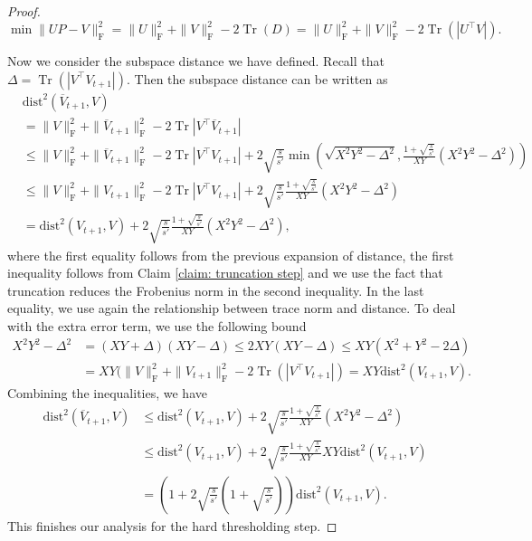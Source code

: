 \documentclass[11pt]{article}
\newcommand{\hs}{s'}
\newcommand{\scale}{V}
\newcommand{\gd}{\overline{V}}
\DeclareMathOperator{\Tr}{Tr}
\newcommand{\0}{{\mathbf{0}}}
\begin{document}
\begin{proof}
\begin{equation*}
    \min \|UP-V\|_\mathrm{F}^2=\|U\|_\mathrm{F}^2+\|V\|_\mathrm{F}^2-2\Tr(D)=\|U\|_\mathrm{F}^2+\|V\|_\mathrm{F}^2-2\Tr(|U^\top  V|).
\end{equation*}

Now we consider the subspace distance we have defined. 
Recall that $\Delta=\Tr(|{\scale}^\top  V_{t+1}|)$. 
Then the subspace distance can be written as
\begin{align*}
   & \mathrm{dist}^2(\gd_{t+1},\scale)\\
   &=\|\scale\|_\mathrm{F}^2+\|\gd_{t+1}\|_\mathrm{F}^2-2\Tr|{\scale}^\top  \gd_{t+1}|\\
    &\leq \|\scale\|_\mathrm{F}^2+\|\gd_{t+1}\|_\mathrm{F}^2-2\Tr|{\scale}^\top  V_{t+1}|+2\sqrt{\frac{s}{\hs}}
      \min\left( \sqrt{X^2Y^2-\Delta^2},
    \frac{1+\sqrt{\frac{s}{\hs}}}{XY}(X^2Y^2-\Delta^2) \right)\\
    &\leq \|\scale\|_\mathrm{F}^2+\|V_{t+1}\|_\mathrm{F}^2-2\Tr|{\scale}^\top  V_{t+1}|+2\sqrt{\frac{s}{\hs}}\frac{1+\sqrt{\frac{s}{\hs}}}{XY}(X^2Y^2-\Delta^2)\\
 & =\mathrm{dist}^2(V_{t+1},\scale)+2\sqrt{\frac{s}{\hs}}\frac{1+\sqrt{\frac{s}{\hs}}}{XY}(X^2Y^2-\Delta^2),
\end{align*}
where the first equality follows from the previous expansion of distance, the first inequality follows from Claim \eqref{claim: truncation step} and we use the fact that truncation reduces the Frobenius norm in the second inequality. In the last equality, we use again the relationship between trace norm and distance. To deal with the extra error term, we use the following bound\begin{align*}
    X^2Y^2-\Delta^2&=(XY+\Delta)(XY-\Delta)\leq 2XY(XY-\Delta)\leq XY(X^2+Y^2-2\Delta)\\
    &=XY(\|\scale\|_\mathrm{F}^2+\|V_{t+1}\|_\mathrm{F}^2-2\Tr(|{\scale}^\top  V_{t+1}|)=XY \mathrm{dist}^2(V_{t+1},\scale).
\end{align*}
Combining the inequalities, we have\begin{align*}
    \mathrm{dist}^2(\gd_{t+1},\scale)&\leq\mathrm{dist}^2(V_{t+1},\scale)+2\sqrt{\frac{s}{\hs}}\frac{1+\sqrt{\frac{s}{\hs}}}{XY}(X^2Y^2-\Delta^2)\\
    &\leq \mathrm{dist}^2(V_{t+1},\scale)+2\sqrt{\frac{s}{\hs}}\frac{1+\sqrt{\frac{s}{\hs}}}{XY}XY \mathrm{dist}^2(V_{t+1},\scale)\\
    &=\left(1+2\sqrt{\frac{s}{\hs}} \left(1+\sqrt{\frac{s}{\hs}} \right) \right)\mathrm{dist}^2(V_{t+1},\scale).
\end{align*}
This finishes our analysis for the hard thresholding step. 
\end{proof}
 
\end{document}
